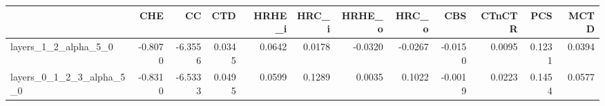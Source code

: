 \begin{tabular}{lrrrrrrrrrrr}
\toprule
 & CHE & CC & CTD & HRHE_i & HRC_i & HRHE_o & HRC_o & CBS & CTnCTR & PCS & MCTD \\
\midrule
layers_1_2_alpha_5_0 & -0.8070 & -6.3556 & 0.0345 & 0.0642 & 0.0178 & -0.0320 & -0.0267 & -0.0150 & 0.0095 & 0.1231 & 0.0394 \\
layers_0_1_2_3_alpha_5_0 & -0.8310 & -6.5333 & 0.0495 & 0.0599 & 0.1289 & 0.0035 & 0.1022 & -0.0019 & 0.0223 & 0.1454 & 0.0577 \\
\bottomrule
\end{tabular}
